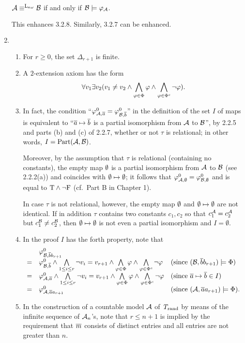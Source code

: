 \begin{enumerate}[1.]
\begin{conjecture}
\begin{center}
$\strct{A} \equv^{\dlog{\kappa}} \strct{B}$ if and only if $\mathcal{B} \models \varphi_{\mathcal{A}}$.
\end{center}
\end{conjecture}
This enhances 3.2.8. Similarly, 3.2.7 can be enhanced.
%
\item {}
\begin{enumerate}[(1)]
\item For $r \geq 0$, the set $\Delta_{r + 1}$ is finite.
\item A $2$-extension axiom has the form
\[
\forall v_1 \exists v_2 (v_1 \neq v_2 \land \bigwedge_{\varphi \in \Phi} \varphi \land \bigwedge_{\varphi \in \Phi^\mathit{c}} \neg\varphi).
\]
\item In fact, the condition ``$\varphi^{0}_{\mathcal{A}, \overline{a}} = \varphi^{0}_{\mathcal{B}, \overline{b}}$'' in the definition of the set $I$ of maps is equivalent to ``$\overline{a} \mapsto \overline{b}$ is a partial isomorphism from $\mathcal{A}$ to $\mathcal{B}$'', by 2.2.5 and parts (b) and (c) of 2.2.7, whether or not $\tau$ is relational; in other words, $I = \mathrm{Part}(\mathcal{A}, \mathcal{B})$.

Moreover, by the assumption that $\tau$ is relational (containing no constants), the empty map $\emptyset$ is a partial isomorphism from $\mathcal{A}$ to $\mathcal{B}$ (see 2.2.2(a)) and coincides with $\emptyset \mapsto \emptyset$; it follows that $\varphi^{0}_{\mathcal{A}, \emptyset} = \varphi^{0}_{\mathcal{B}, \emptyset}$ and is equal to $\mathrm{T} \land \neg\mathrm{F}$ (cf.\ Part B in Chapter 1).

In case $\tau$ is not relational, however, the empty map $\emptyset$ and $\emptyset \mapsto \emptyset$ are not identical. If in addition $\tau$ contains two constants $c_1, c_2$ so that $c_1^{\mathcal{A}} = c_2^{\mathcal{A}}$ but $c_1^{\mathcal{B}} \neq c_2^{\mathcal{B}}$, then $\emptyset \mapsto \emptyset$ is not even a partial isomorphism and $I = \emptyset$.
\item In the proof $I$ has the forth property, note that
\[
\begin{array}{lll}
\ & \hint{0}{\strct{B}, \vect{b}b_{r + 1}} & \cr
= & \hint{0}{\strct{B}, \vect{b}} \land \bland\limits_{1 \leq i \leq r} \neg v_i = v_{r + 1} \land \bland\limits_{\varphi \in \Phi} \varphi \land \bland\limits_{\varphi \in \cmpl{\Phi}} \neg\varphi & \text{(since \mathmode{(\strct{B}, \vect{b}b_{r + 1}) \satis \Phi})} \cr
= & \hint{0}{\strct{A}, \vect{a}} \land \bland\limits_{1 \leq i \leq r} \neg v_i = v_{r + 1}\land \bland\limits_{\varphi \in \Phi} \varphi \land \bland\limits_{\varphi \in \cmpl{\Phi}} \neg\varphi & \text{(since \mathmode{\vect{a} \mapsto \vect{b} \in I})} \cr
= & \hint{0}{\strct{A}, \vect{a}a_{r + 1}} & \text{(since \mathmode{(\strct{A}, \vect{a}a_{r + 1}) \satis \Phi})}. \cr
\end{array}
\]
\item In the construction of a countable model $\mathcal{A}$ of $\mathit{T}_{\mathrm{rand}}$ by means of the infinite sequence of $\mathcal{A}_n$'s, note that $r \leq n + 1$ is implied by the requirement that $\overline{m}$ consists of distinct entries and all entries are not greater than $n$.


\end{enumerate}
\end{enumerate}

